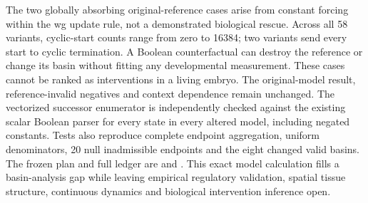 The two globally absorbing original-reference cases arise from constant forcing within the wg update rule, not a demonstrated biological rescue. Across all 58 variants, cyclic-start counts range from zero to 16384; two variants send every start to cyclic termination. A Boolean counterfactual can destroy the reference or change its basin without fitting any developmental measurement. These cases cannot be ranked as interventions in a living embryo. The original-model result, reference-invalid negatives and context dependence remain unchanged.
The vectorized successor enumerator is independently checked against the existing scalar Boolean parser for every state in every altered model, including negated constants. Tests also reproduce complete endpoint aggregation, uniform denominators, 20 null inadmissible endpoints and the eight changed valid basins. The frozen plan and full ledger are  and . This exact model calculation fills a basin-analysis gap while leaving empirical regulatory validation, spatial tissue structure, continuous dynamics and biological intervention inference open.

